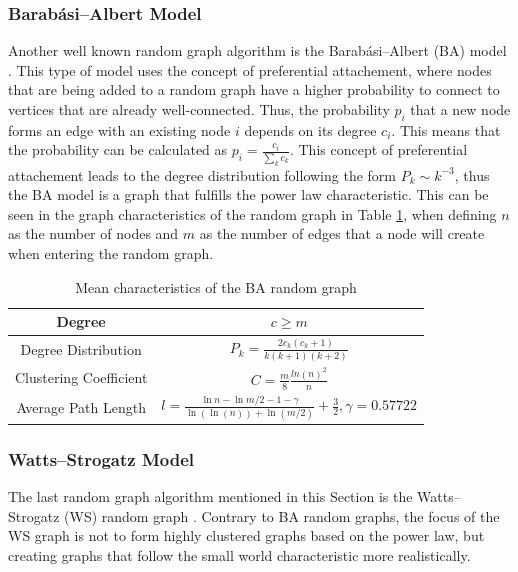 \subsubsection{Barabási–Albert Model}

Another well known random graph algorithm is the Barabási–Albert (BA) model 
\cite{barabasimodel}. 
This type of model uses the concept of preferential attachement, 
where nodes that are being added to a random graph have a higher 
probability to connect to vertices that are already well-connected. 
Thus, the probability $p_i$ that a new node forms an edge with an
existing node $i$ depends on its degree $c_i$. This means that the
probability can be calculated as $p_i= \frac{c_i}{\sum_{k}c_k}$.
This concept of preferential attachement leads to the degree distribution
following the form $P_k\sim k^{-3}$, thus the BA model is a graph 
that fulfills the power law characteristic.
This can be seen in the graph characteristics of the random graph
in Table \ref{ba-model}, when defining $n$ as the number
of nodes and $m$ as the number of edges that a node
will create when entering the random graph.

\begin{table}[ht!]
    \centering
    \begin{tabular}{|c | c |} 
     \hline
     Degree & $c\geq m$ \\ 
     \hline
     Degree Distribution & 
     $P_k = \frac{2c_k(c_k+1)}{k(k+1)(k+2)}$ \\ 
     \hline
     Clustering Coefficient \cite{ba_cluster_coeff} & 
     $C=\frac{m}{8}\frac{ln(n)^2}{n}$ \\ 
     \hline
     Average Path Length \cite{averagepath}& 
     $l = \frac{\ln{n}- \ln{m/2} - 1 - \gamma}{\ln(\ln(n))+\ln{(m/2)}} + \frac{3}{2}, 
     \gamma=0.57722$ \\ 
     \hline
    \end{tabular}
    \caption{Mean characteristics of the BA random graph \cite{basicnetwork}}
    \label{ba-model}
\end{table}

\subsubsection{Watts–Strogatz Model}
The last random graph algorithm mentioned in this Section 
is the Watts–Strogatz (WS) random graph \cite{wattsmodel}.
Contrary to BA random graphs, the focus of the WS graph is not to 
form highly clustered graphs based on the power law, but creating graphs
that follow the small world characteristic more realistically.

